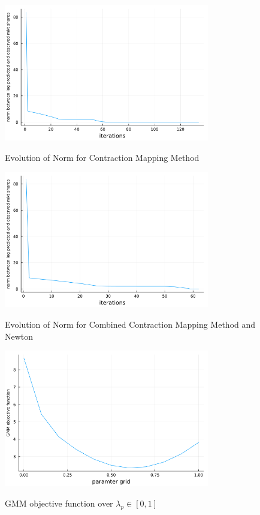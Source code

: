 \documentclass[12pt]{article}
\begin{document}
\begin{figure}[!htbp]
	\centering
	\caption{Evolution of Norm for Contraction Mapping Method}
	\includegraphics[width = 0.8\textwidth]{fixed_point_norm_evolution.png}
	\label{fixed_point_norm_evolution}
\end{figure}

\begin{figure}[!htbp]
	\centering
	\caption{Evolution of Norm for Combined Contraction Mapping Method and Newton}
	\includegraphics[width = 0.8\textwidth]{newton_norm_evolution.png}
	\label{newton_norm_evolution}
\end{figure}

\begin{figure}[!htbp]
	\centering
	\caption{GMM objective function over $\lambda_p \in [0,1]$}
	\includegraphics[width = 0.8\textwidth]{gmm_obj_func.png}
	\label{gmm_obj_func}
\end{figure}


\end{document}
